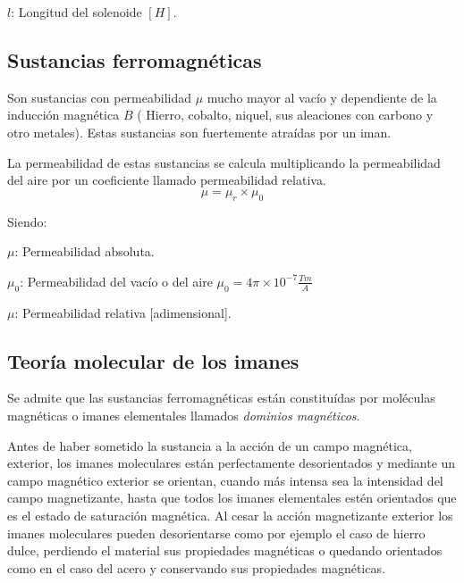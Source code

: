 $l$: Longitud del solenoide $[H]$.

\subsection{Sustancias ferromagnéticas}

Son sustancias con permeabilidad $\mu$ mucho mayor al vacío y dependiente de la inducción magnética $B$ ( Hierro, cobalto, niquel, sus aleaciones con carbono y otro metales). Estas sustancias son fuertemente atraídas por un iman.

La permeabilidad de estas sustancias se calcula multiplicando la permeabilidad del aire por un coeficiente llamado permeabilidad relativa.
\begin{equation}
    \mu=\mu_r \times \mu_0
\end{equation}

Siendo:

$\mu$: Permeabilidad absoluta.

$\mu_0$: Permeabilidad del vacío o del aire $\mu_0 = 4 \pi \times 10^{-7} \frac{Tm}{A}$

$\mu$: Permeabilidad relativa [adimensional].

\subsection{Teoría molecular de los imanes}

Se admite que las sustancias ferromagnéticas están constituídas por moléculas magnéticas o imanes elementales llamados \emph{dominios magnéticos}.

Antes de haber sometido la sustancia a la acción de un campo magnética, exterior, los imanes moleculares están perfectamente desorientados y mediante un campo magnético exterior se orientan, cuando más intensa sea la intensidad del campo magnetizante, hasta que todos los imanes elementales estén orientados que es el estado de saturación magnética.
Al cesar la acción magnetizante exterior los imanes moleculares pueden desorientarse como por ejemplo el caso de hierro dulce, perdiendo el material sus propiedades magnéticas o quedando orientados como en el caso del acero y conservando sus propiedades magnéticas.

